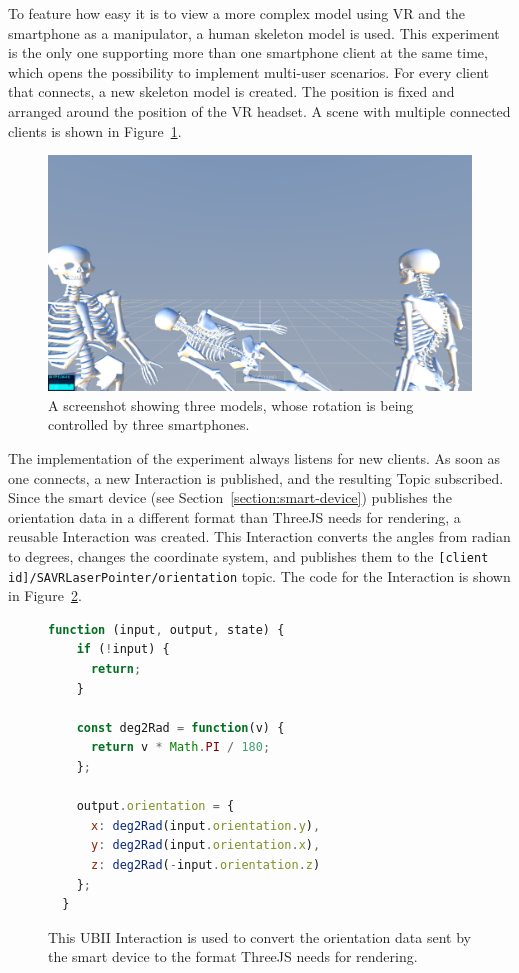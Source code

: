 To feature how easy it is to view a more complex model using \gls{VR} and the smartphone as a manipulator, a human skeleton model is used. This experiment is the only one supporting more than one smartphone client at the same time, which opens the possibility to implement multi-user scenarios. For every client that connects, a new skeleton model is created. The position is fixed and arranged around the position of the \gls{VR} headset. A scene with multiple connected clients is shown in Figure~\ref{fig:screenshot-exp-mv}.

\begin{figure}[H]
	\centering
	\includegraphics[width=12cm]{figures/implementation/screenshot_exp_mv.png}
	\caption[Screenshot of the model viewer]{A screenshot showing three models, whose rotation is being controlled by three smartphones.}\label{fig:screenshot-exp-mv}
\end{figure}

The implementation of the experiment always listens for new clients. As soon as one connects, a new Interaction is published, and the resulting Topic subscribed. Since the smart device (see Section~\ref{section:smart-device}) publishes the orientation data in a different format than ThreeJS needs for rendering, a reusable Interaction was created. This Interaction converts the angles from radian to degrees, changes the coordinate system, and publishes them to the \lstinline[breaklines=true]{[client id]/SAVRLaserPointer/orientation} topic. The code for the Interaction is shown in Figure~\ref{fig:ubii-interaction-angles}.

\begin{figure}[H]
	\begin{lstlisting}[language=JavaScript]
  function (input, output, state) {
    if (!input) {
      return;
    }

    const deg2Rad = function(v) {
      return v * Math.PI / 180;
    };

    output.orientation = {
      x: deg2Rad(input.orientation.y),
      y: deg2Rad(input.orientation.x),
      z: deg2Rad(-input.orientation.z)
    };
  }
 \end{lstlisting}
  \caption[A UBII Interaction of model viewer]{This \gls{UBII} Interaction is used to convert the orientation data sent by the smart device to the format ThreeJS needs for rendering.}\label{fig:ubii-interaction-angles} %
\end{figure}

